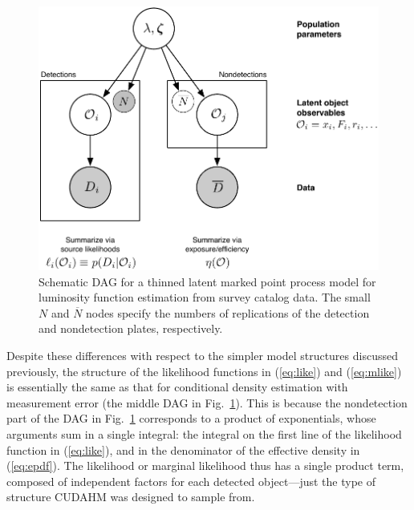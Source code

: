 \documentclass[12pt]{article}
\numberwithin{equation}{section}
\numberwithin{figure}{section}
\numberwithin{table}{section}
\begin{document}
\begin{figure}
\begin{center}
\includegraphics[width=.8\textwidth]{fig/DAG-TLPP}
\end{center}
\caption{Schematic DAG for a thinned latent marked point process model for luminosity function estimation from survey catalog data.
The small $N$ and $\overline{N}$ nodes specify the numbers of replications of the detection and nondetection plates, respectively.}
\label{fig:DAG-TLPP}
\end{figure}

Despite these differences with respect to the simpler model structures discussed previously, the structure of the likelihood functions in (\ref{eq:like}) and (\ref{eq:mlike}) is essentially the same as that for conditional density estimation with measurement error (the middle DAG in Fig.~\ref{fig:DAG-TLPP}).
This is because the nondetection part of the DAG in Fig.~\ref{fig:DAG-TLPP} corresponds to a product of exponentials, whose arguments sum in a single integral: the integral on the first line of the likelihood function in (\ref{eq:like}), and in the denominator of the effective density in (\ref{eq:epdf}).
The likelihood or marginal likelihood thus has a single product term, composed of independent factors for each detected object---just the type of structure CUDAHM was designed to sample from.



\end{document}
